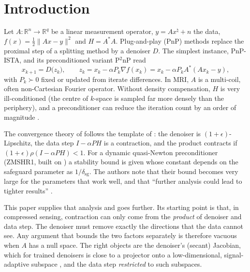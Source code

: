 \documentclass[11pt]{article}
\theoremstyle{definition}
\theoremstyle{remark}
\newcommand{\RR}{\mathbb R}
\newcommand{\norm}[1]{\lVert #1\rVert}
\newcommand{\dsg}{\delta_{\mathrm{sg}}}
\newcommand{\xt}{x^\natural}
\begin{document}
\section{Introduction}\label{sec:intro}

Let $A:\RR^n\to\RR^q$ be a linear measurement operator, $y=A\xt+n$ the data, $f(x)=\tfrac12\norm{Ax-y}^2$ and
$H=A^*A$. Plug-and-play (PnP) methods \cite{venkatakrishnan2013,kamilov2023pnp} replace the proximal step of a
splitting method by a denoiser $D$. The simplest instance, PnP-ISTA, and its preconditioned variant P$^2$nP
\cite{hong2024p2np} read
\begin{equation}\label{eq:pnp}
  x_{k+1}=D\big(z_k\big),\qquad z_k=x_k-\alpha P_k\nabla f(x_k)=x_k-\alpha P_kA^*(Ax_k-y),
\end{equation}
with $P_k\succ0$ fixed or updated from iterate differences. In MRI, $A$ is a multi-coil, often non-Cartesian
Fourier operator. Without density compensation, $H$ is very ill-conditioned (the centre of $k$-space is
sampled far more densely than the periphery), and a preconditioner can reduce the iteration count by an order of
magnitude \cite{hong2024p2np}.

The convergence theory of \cite{hong2024p2np} follows the template of \cite{ryu2019}: the denoiser is
$(1+\epsilon)$-Lipschitz, the data step $I-\alpha PH$ is a contraction, and the product contracts if
$(1+\epsilon)\rho(I-\alpha PH)<1$. For a dynamic quasi-Newton preconditioner (ZMSHR1, built on
\cite{osborne1999,becker2012qn,becker2019qn,hong2024complexqn}) a stability bound is given whose constant depends
on the safeguard parameter as $1/\dsg$. The authors note that their bound becomes very large for the parameters
that work well, and that ``further analysis could lead to tighter results'' \cite[Sec.~III]{hong2024p2np}.

This paper supplies that analysis and goes further. Its starting point is that, in compressed sensing,
contraction can only come from the \emph{product} of denoiser and data step. The denoiser must remove exactly the
directions that the data cannot see. Any argument that bounds the two factors separately is therefore vacuous
when $A$ has a null space. The right objects are the denoiser's (secant) Jacobian, which for trained denoisers is
close to a projector onto a low-dimensional, signal-adaptive subspace \cite{mohan2020,kadkhodaie2021,kadkhodaie2024},
and the data step \emph{restricted} to such subspaces.
\end{document}
